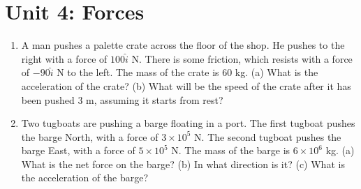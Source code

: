 \documentclass[10pt]{article}
\begin{document}
\section{Unit 4: Forces}

\begin{enumerate}
\item A man pushes a palette crate across the floor of the shop.  He pushes to the right with a force of $100\hat{i}$ N.  There is some friction, which resists with a force of $-90\hat{i}$ N to the left.  The mass of the crate is 60 kg. (a) What is the acceleration of the crate? (b) What will be the speed of the crate after it has been pushed 3 m, assuming it starts from rest? \\ \vspace{2.5cm}
\item Two tugboats are pushing a barge floating in a port.  The first tugboat pushes the barge North, with a force of $3\times 10^5$ N.  The second tugboat pushes the barge East, with a force of $5 \times 10^5$ N.  The mass of the barge is $6 \times 10^6$ kg.  (a) What is the net force on the barge?  (b) In what direction is it?  (c) What is the acceleration of the barge?
\end{enumerate}
\end{document}
